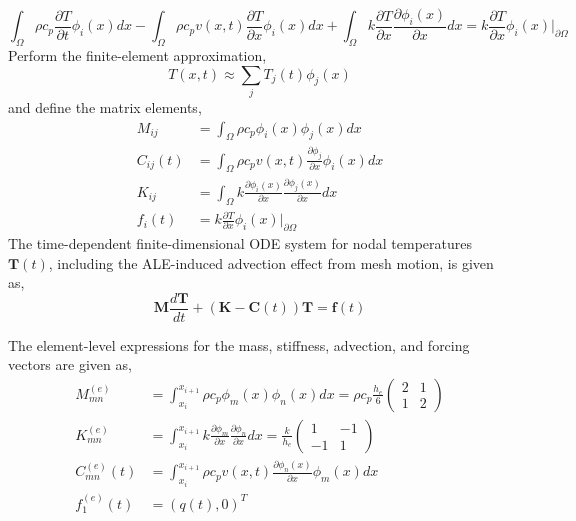 \begin{equation}
    \int_{\Omega}\rho c_p\frac{\partial T}{\partial t}\phi_i(x)dx - \int_{\Omega}\rho c_p v(x,t)\frac{\partial T}{\partial x}\phi_i(x)dx + \int_{\Omega} k\frac{\partial T}{\partial x}\frac{\partial\phi_i(x)}{\partial x} dx = k\frac{\partial T}{\partial x}\phi_i(x)\Bigg|_{\partial\Omega}
\end{equation}
Perform the finite-element approximation,
\begin{equation}
    T(x,t)\approx\sum_jT_j(t)\phi_j(x)
\end{equation}
and define the matrix elements,
\begin{align}
    M_{ij} &= \int_{\Omega}\rho c_p\phi_i(x)\phi_j(x)dx\\
    C_{ij}(t) &= \int_{\Omega}\rho c_p v(x,t) \frac{\partial\phi_j}{\partial x}\phi_i(x)dx\\
    K_{ij} &= \int_{\Omega}k\frac{\partial\phi_i(x)}{\partial x}\frac{\partial\phi_j(x)}{\partial x}dx\\
    f_i(t) &= k\frac{\partial T}{\partial x}\phi_i(x)\Bigg|_{\partial\Omega}
\end{align}
The time-dependent finite-dimensional ODE system for nodal temperatures $\mathbf{T}(t)$, including the ALE-induced advection effect from mesh motion, is given as,
\begin{equation}
    \mathbf{M}\frac{d\mathbf{T}}{dt} + \left(\mathbf{K} - \mathbf{C}(t)\right)\mathbf{T} = \mathbf{f}(t)
\end{equation}

The element-level expressions for the mass, stiffness, advection, and forcing vectors are given as,
\begin{align}
    M^{(e)}_{mn} &= \int_{x_i}^{x_{i+1}}\rho c_p\phi_m(x)\phi_n(x)dx = \rho c_p \frac{h_e}{6}\begin{pmatrix}
        2 & 1 \\ 1 & 2
    \end{pmatrix}\\
    K^{(e)}_{mn} &= \int_{x_i}^{x_{i+1}} k \frac{\partial \phi_m}{\partial x}\frac{\partial \phi_n}{\partial x} dx = \frac{k}{h_e}\begin{pmatrix}
        1 & -1 \\ -1 & 1
    \end{pmatrix}\\
    C^{(e)}_{mn}(t) &= \int_{x_i}^{x_{i+1}}\rho c_p v(x,t) \frac{\partial \phi_n(x)}{\partial x}\phi_m(x) dx\\
    f^{(e)}_1(t) &= \left(q(t),0\right)^T
\end{align}